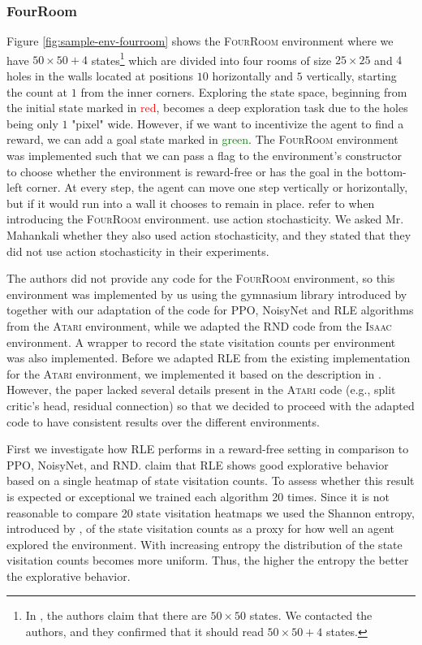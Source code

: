 \documentclass[10pt]{article} %
\begin{document}
\subsubsection{FourRoom}
Figure \ref{fig:sample-env-fourroom} shows the \textsc{FourRoom} environment where we have $50\times50 + 4$ states\footnote{In \cite{rle-paper}, the authors claim that there are $50\times 50$ states. We contacted the authors, and they confirmed that it should read $50\times 50 + 4$ states.} which are divided into four rooms of size $25\times25$ and $4$ holes in the walls located at positions $10$ horizontally and $5$ vertically, starting the count at $1$ from the inner corners. Exploring the state space, beginning from the initial state marked in \textcolor{red}{red}, becomes a deep exploration task due to the holes being only $1$ "pixel" wide. However, if we want to incentivize the agent to find a reward, we can add a goal state marked in \textcolor{green}{green}. The \textsc{FourRoom} environment was implemented such that we can pass a flag to the environment's constructor to choose whether the environment is reward-free or has the goal in the bottom-left corner. At every step, the agent can move one step vertically or horizontally, but if it would run into a wall it chooses to remain in place. \cite{rle-paper} refer to \cite{grid-world-paper} when introducing the \textsc{FourRoom} environment. \cite{grid-world-paper} use action stochasticity. We asked Mr. Mahankali whether they also used action stochasticity, and they stated that they did not use action stochasticity in their experiments. 

The authors did not provide any code for the \textsc{FourRoom} environment, so this environment was implemented by us using the gymnasium library introduced by \cite{gymnasium-paper} together with our adaptation of the code for PPO, NoisyNet and RLE algorithms from the \textsc{Atari} environment, while we adapted the RND code from the \textsc{Isaac} environment. A wrapper to record the state visitation counts per environment was also implemented. Before we adapted RLE from the existing implementation for the \textsc{Atari} environment, we implemented it based on the description in \cite{rle-paper}. However, the paper lacked several details present in the \textsc{Atari} code (e.g., split critic's head, residual connection) so that we decided to proceed with the adapted code to have consistent results over the different environments. 

First we investigate how RLE performs in a reward-free setting in comparison to PPO, NoisyNet, and RND. \cite{rle-paper} claim that RLE shows good explorative behavior based on a single heatmap of state visitation counts. To assess whether this result is expected or exceptional we trained each algorithm 20 times. Since it is not reasonable to compare 20 state visitation heatmaps we used the Shannon entropy, introduced by \cite{shannon-entropy-paper}, of the state visitation counts as a proxy for how well an agent explored the environment. With increasing entropy the distribution of the state visitation counts becomes more uniform. Thus, the higher the entropy the better the explorative behavior. 
\end{document}
